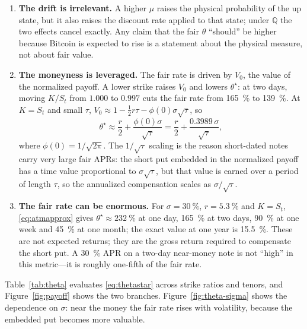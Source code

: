\documentclass[11pt]{article}
\newcommand{\Q}{\mathbb{Q}}
\begin{document}
\begin{enumerate}[leftmargin=1.4em,itemsep=3pt]
\item \textbf{The drift is irrelevant.} A higher $\mu$ raises the physical probability of the up state, but it also raises the discount rate applied to that state; under $\Q$ the two effects cancel exactly. Any claim that the fair $\theta$ ``should'' be higher because Bitcoin is expected to rise is a statement about the physical measure, not about fair value.

\item \textbf{The moneyness is leveraged.} The fair rate is driven by $V_0$, the value of the normalized payoff. A lower strike raises $V_0$ and lowers $\theta^\star$: at two days, moving $K/S_t$ from $1.000$ to $0.997$ cuts the fair rate from \SI{165}{\percent} to \SI{139}{\percent}. At $K=S_t$ and small $\tau$, $V_0\approx1-\tfrac12 r\tau-\phi(0)\sigma\sqrt{\tau}$, so
\begin{equation}\label{eq:atmapprox}
\theta^\star\approx \frac{r}{2}+\frac{\phi(0)\sigma}{\sqrt{\tau}}
=\frac{r}{2}+\frac{0.3989\,\sigma}{\sqrt{\tau}},
\end{equation}
where $\phi(0)=1/\sqrt{2\pi}$. The $1/\sqrt{\tau}$ scaling is the reason short-dated notes carry very large fair APRs: the short put embedded in the normalized payoff has a time value proportional to $\sigma\sqrt{\tau}$, but that value is earned over a period of length $\tau$, so the annualized compensation scales as $\sigma/\sqrt{\tau}$.

\item \textbf{The fair rate can be enormous.} For $\sigma=\SI{30}{\percent}$, $r=\SI{5.3}{\percent}$ and $K=S_t$, \eqref{eq:atmapprox} gives $\theta^\star\approx\SI{232}{\percent}$ at one day, \SI{165}{\percent} at two days, \SI{90}{\percent} at one week and \SI{45}{\percent} at one month; the exact value at one year is \SI{15.5}{\percent}. These are not expected returns; they are the gross return required to compensate the short put. A \SI{30}{\percent} APR on a two-day near-money note is not ``high'' in this metric---it is roughly one-fifth of the fair rate.
\end{enumerate}

Table~\ref{tab:theta} evaluates \eqref{eq:thetastar} across strike ratios and tenors, and Figure~\ref{fig:payoff} shows the two branches. Figure~\ref{fig:theta-sigma} shows the dependence on $\sigma$: near the money the fair rate rises with volatility, because the embedded put becomes more valuable.
\end{document}
